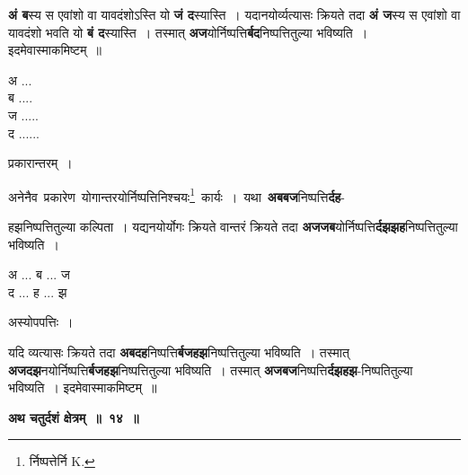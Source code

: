 \documentclass[11pt, openany]{book}
\begin{document}
\begin{flushleft}
\begin{minipage}[t]{0.75\textwidth}
\hspace{4mm} \textbf{अं ब}स्य स एवांशो वा यावदंशोऽस्ति यो \textbf{जं द}स्यास्ति~। यदानयोर्व्यत्यासः क्रियते तदा \textbf{अं ज}स्य स एवांशो वा यावदंशो भवति यो \textbf{बं द}स्यास्ति~। तस्मात् \textbf{अज}योर्निष्पत्ति\textbf{र्बद}निष्पत्तितुल्या भविष्यति~। इदमेवास्माकमिष्टम्~॥ 
\end{minipage} 
\hfill
\begin{minipage}[t]{0.15\textwidth}
अ ...\\
ब ....\\
ज .....\\
द ......
\end{minipage}
\end{flushleft}

\newpage
\begin{center}
प्रकारान्तरम्~।
\end{center}

 अनेनैव \,प्रकारेण \,योगान्तरयोर्निष्पत्तिनिश्चयः\renewcommand{\thefootnote}{१}\footnote{र्निष्पत्तेर्नि {\en K.}} \,कार्यः~। \,यथा \,\textbf{अबबज}निष्पत्ति\textbf{र्दह}-
\vspace{-3mm}

\begin{flushleft}
\begin{minipage}[t]{0.68\textwidth}
हझनिष्पत्तितुल्या कल्पिता~। 
यद्यनयोर्योगः क्रियते वान्तरं क्रियते  तदा
\textbf{अजजब}योर्निष्पत्ति\textbf{र्दझझह}निष्पत्तितुल्या भविष्यति~। 
\end{minipage} 
\hfill
\begin{minipage}[t]{0.22\textwidth}
अ ... ब ... ज \\
द ... ह ... झ
\end{minipage}
\end{flushleft}


\begin{center}
अस्योपपत्तिः~।
\end{center}

यदि व्यत्यासः क्रियते तदा \textbf{अबदह}निष्पत्ति\textbf{र्बजहझ}निष्पत्तितुल्या भविष्यति~। तस्मात्
\textbf{अजदझ}नयोर्निष्पत्ति\textbf{र्बजहझ}निष्पत्तितुल्या 
भविष्यति~। तस्मात् \textbf{अजबज}निष्पत्ति\textbf{र्दझहझ}-निष्पतितुल्या भविष्यति~।
इदमेवास्माकमिष्टम्~॥ 
\vspace{2mm}

\begin{center}
\textbf{\large अथ चतुर्दशं क्षेत्रम्~॥~१४~॥}
\end{center}
\end{document}
